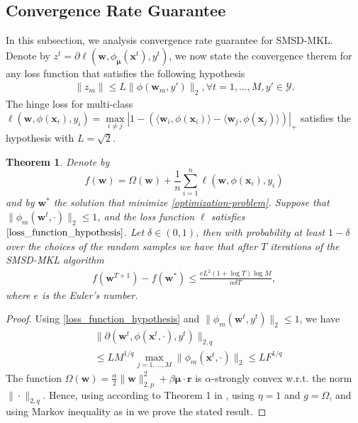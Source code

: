 \documentclass{article}
\newtheorem{theorem}{Theorem}
\begin{document}
\subsection{Convergence Rate Guarantee}
In this subsection, we analysis convergence rate guarantee for SMSD-MKL.
Denote by $z^t=\partial\ell(\mathbf w,\phi_{\bm \mu}(\mathbf{x}^t), y^t)$,
we now state the convergence therem for any loss function that satisfies the following hypothesis
\begin{align}
\label{loss_function_hypothesis}
    \|z_m\| \leq L\|\phi(\mathbf w_m, y')\|_2, \forall t =1,\ldots, M, y' \in \mathcal{Y}.
\end{align}
The hinge loss for multi-class $\ell(\mathbf w,\phi(\mathbf{x}_i), y_i)=
\max\limits_{i \not= j}\left|1-\left(\langle\mathbf w_i, \phi(\mathbf{x}_i)\rangle -\langle\mathbf w_j, \phi(\mathbf{x}_j)\rangle\right)\right|_+$ satisfies the hypothesis with $L=\sqrt{2}$.

\begin{theorem}
Denote by $$f(\mathbf w)=\Omega(\mathbf w)+\frac{1}{n}\sum_{i=1}^n\ell(\mathbf w,\phi(\mathbf{x}_i),y_i)$$
and by $\mathbf w^\ast$ the solution that minimize \eqref{optimization-problem}.
Suppose that $\|\phi_m(\mathbf w^t,\cdot)\|_2 \leq 1$, and the loss function $\ell$ satisfies $\eqref{loss_function_hypothesis}$.
Let $\delta \in (0,1)$, then with probability at least $1 - \delta$ over the choices of the random samples
we have that after $T$ iterations of the SMSD-MKL algorithm
\begin{align*}
    f(\mathbf w^{T+1})-f(\mathbf w^\ast) \leq \frac{eL^2(1+\log T)\log M}{\alpha\delta T},
\end{align*}
where $e$ is the Euler's number.
\end{theorem}
\begin{proof}
Using \eqref{loss_function_hypothesis} and $\|\phi_m(\mathbf w^t, y^t)\|_2 \leq 1$, we have
\begin{align*}
    &\|\partial(\mathbf w^t,\phi(\mathbf{x}^t,\cdot), y^t)\|_{2,q} \\
    &\leq LM^{1/q} \max_{j=1, \ldots, M} \|\phi_m(\mathbf{x}^t, \cdot)\|_2 \leq LF^{1/q}
\end{align*}
The function $\Omega(\mathbf w)=\frac{\alpha}{2}\|\mathbf w\|_{2,p}^2 + \beta\mathbf{\mu} \cdot \mathbf{r}$ is
 $\alpha$-strongly convex w.r.t. the norm $\|\cdot\|_{2,q}$. Hence, using according to Theorem 1 in \cite{Shalev-ShwartzSS07},
 using $\eta=1$ and $g=\Omega$, and using Markov inequality as in \cite{Shalev-ShwartzSS07} we prove the stated result.
\end{proof}
\end{document}
